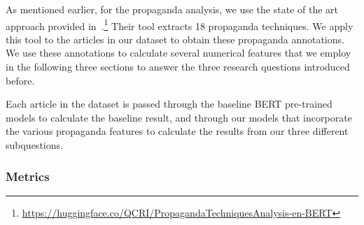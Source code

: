 As mentioned earlier, for the propaganda analysis, we use the state of the art approach provided in~\citet{da2019fine}.\footnote{\url{https://huggingface.co/QCRI/PropagandaTechniquesAnalysis-en-BERT}} Their tool extracts 18 propaganda techniques. We apply this tool to the articles in our dataset to obtain these propaganda annotations. 
We use these annotations to calculate several numerical features that we employ in the following three sections to answer the three research questions introduced before.



Each article in the dataset is passed through the baseline BERT pre-trained models to calculate the baseline result, and through our models that incorporate the various propaganda features to calculate the results from our three different subquestions. %

\subsubsection{Metrics}

